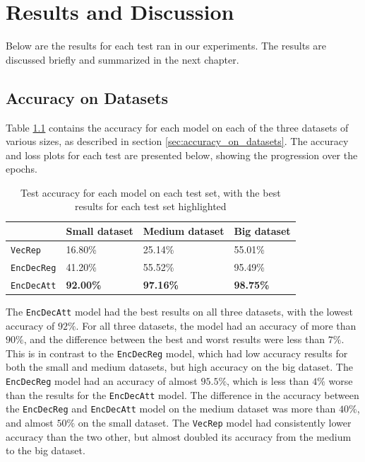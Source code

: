 
\chapter{Results and Discussion}
\label{ch:results}
Below are the results for each test ran in our experiments. The results are discussed briefly and summarized in the next chapter.


\section{Accuracy on Datasets}
Table \ref{table:accuracy_model_data_sets} contains the accuracy for each model on each of the three datasets of various sizes, as described in section \ref{sec:accuracy_on_datasets}. The accuracy and loss plots for each test are presented below, showing the progression over the epochs.

\begin{table}[H]
    \centering
    \begin{tabular}{|l|l|l|l|}
        \hline 
                                        & \textbf{Small dataset}          & \textbf{Medium dataset}         & \textbf{Big dataset}            \\ \hline
        {\tt VecRep }                   & 16.80\%                         & 25.14\%                         & 55.01\%                         \\ \hline
        {\tt EncDecReg}                 & 41.20\%                         & 55.52\%                         & 95.49\%                         \\ \hline
        {\tt EncDecAtt}                 & \textbf{92.00\%}                & \textbf{97.16\%}                & \textbf{98.75\%}                \\ \hline
    \end{tabular}
    \caption{Test accuracy for each model on each test set, with the best results for each test set highlighted}
    \label{table:accuracy_model_data_sets}
\end{table}

The {\tt EncDecAtt} model had the best results on all three datasets, with the lowest accuracy of \(92\%\). For all three datasets, the model had an accuracy of more than \(90\%\), and the difference between the best and worst results were less than \(7\%\). This is in contrast to the {\tt EncDecReg} model, which had low accuracy results for both the small and medium datasets, but high accuracy on the big dataset. The {\tt EncDecReg} model had an accuracy of almost \(95.5\%\), which is less than \(4\%\) worse than the results for the {\tt EncDecAtt} model. The difference in the accuracy between the {\tt EncDecReg} and {\tt EncDecAtt} model on the medium dataset was more than \(40\%\), and almost \(50\%\) on the small dataset. The {\tt VecRep} model had consistently lower accuracy than the two other, but almost doubled its accuracy from the medium to the big dataset.

